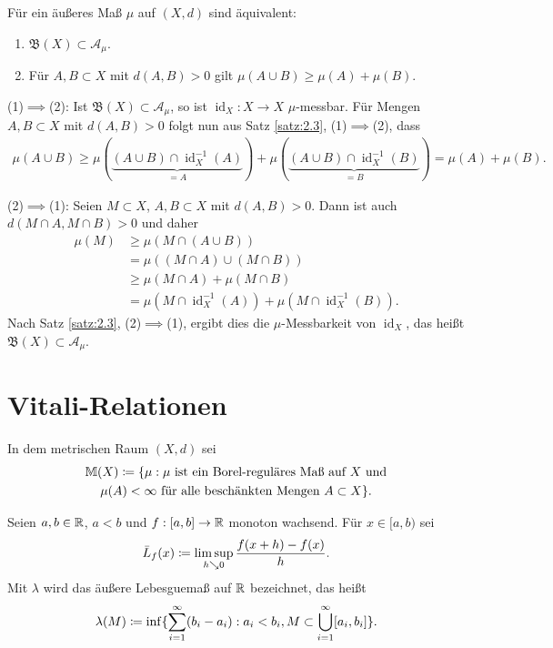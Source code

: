 \documentclass[a4paper,twoside,DIV15,BCOR12mm]{scrbook}
\newcommand{\A}{\mathcal A}
\newcommand{\borel}{\mathfrak B}
\DeclareMathOperator{\id}{id}
\begin{document}
\begin{satz}
\label{satz:2.4}
Für ein äußeres Maß $\mu$ auf $(X,d)$ sind äquivalent:
\begin{enumerate}
\item $\borel(X) \subset \A_\mu$.
\item Für $A,B\subset X$ mit $d(A,B)>0$ gilt $\mu(A\cup B) \ge \mu(A) + \mu(B)$.
\end{enumerate}
\end{satz}

\begin{beweis}
(1)$\implies$(2): Ist $\borel(X)\subset \A_\mu$, so ist $\id_X: X\to X$ $\mu$-messbar. Für Mengen $A,B\subset X$ mit $d(A,B)>0$ folgt nun aus Satz \ref{satz:2.3}, (1)$\implies$(2), dass 
\begin{align*}
\mu(A\cup B) \ge \mu( \underbrace{(A\cup B) \cap \id_X^{-1}(A)}_{=A} ) + \mu( \underbrace{(A\cup B) \cap \id_X^{-1}(B)}_{=B}) = \mu(A) + \mu(B).
\end{align*}

(2)$\implies$(1): Seien $M\subset X$, $A,B\subset X$ mit $d(A,B)>0$. Dann ist auch $d(M\cap A, M\cap B)>0$ und daher
\begin{align*}
\mu(M)
&\ge \mu( M\cap (A\cup B) )\\
&= \mu( (M\cap A)\cup (M\cap B) )\\
&\ge \mu(M\cap A) + \mu(M\cap B)\\
&= \mu(M \cap \id_X^{-1}(A)) + \mu(M \cap \id_X^{-1}(B)).
\end{align*}
Nach Satz \ref{satz:2.3}, (2)$\implies$(1), ergibt dies die $\mu$-Messbarkeit von $\id_X$, das heißt $\borel(X)\subset \A_\mu$.
\end{beweis}

\section{Vitali-Relationen}

In dem metrischen Raum $(X,d)$ sei 
\begin{multline*}
\mathbb M(X) \da \{\mu: \text{$\mu$ ist ein Borel-reguläres Maß auf $X$ und}\\\text{$\mu(A)<\infty$ für alle beschänkten Mengen $A\subset X$}\}.
\end{multline*}

\begin{motivation}
Seien $a,b\in\mathbb{R}$, $a<b$ und $f:[a,b]\to \mathbb{R}$ monoton wachsend. Für $x\in[a,b)$ sei 
\[
\bar L_f(x) \da \limsup_{h\searrow0} \frac{f(x+h) - f(x)}{h}.
\]
Mit $\lambda$ wird das äußere Lebesguemaß auf $\mathbb{R}$ bezeichnet, das heißt
\[
\lambda(M) \da\inf\{\sum_{i=1}^\infty (b_i-a_i): a_i < b_i, M\subset \bigcup_{i=1}^\infty [a_i, b_i]\}.
\]
\end{motivation}
\end{document}
